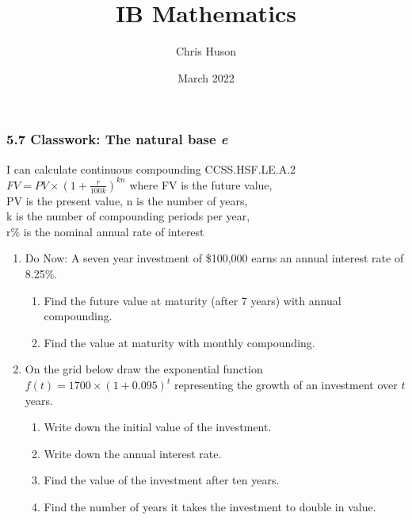 \documentclass[12pt, twoside]{article}
\title{IB Mathematics}
\author{Chris Huson}
\date{March 2022}
\begin{document}
\subsubsection*{5.7 Classwork: The natural base \emph{e}}
I can calculate continuous compounding \hfill CCSS.HSF.LE.A.2 \\[0.5cm]
$\displaystyle FV=PV \times \left(1+\frac{r}{100k} \right)^{kn}$
where FV is the future value,\\[0.25cm]
PV is the present value, n is the number of years, \\
 k is the number of compounding periods per year, \\
 r\% is the nominal annual rate of interest

\begin{enumerate}
\item Do Now: A seven year investment of \$100,000 earns an annual interest rate of 8.25\%.
\begin{enumerate}[itemsep=2cm]
    \item Find the future value at maturity (after 7 years) with annual compounding. 
    \item Find the value at maturity with monthly compounding.
\end{enumerate} \vspace{2cm}

\item On the grid below draw the exponential function $\displaystyle f(t)=1700 \times \left( 1+0.095 \right)^t$ representing the growth of an investment over $t$ years.
\begin{multicols}{2}
    \begin{enumerate}[itemsep=1.2cm]
        \item Write down the initial value of the investment.
        \item Write down the annual interest rate.
        \item Find the value of the investment after ten years.\vspace{1cm}
        \item Find the number of years it takes the investment to double in value.
    \end{enumerate}
    \begin{center}
    \end{center}
    \end{multicols}


\end{enumerate}
\end{document}
